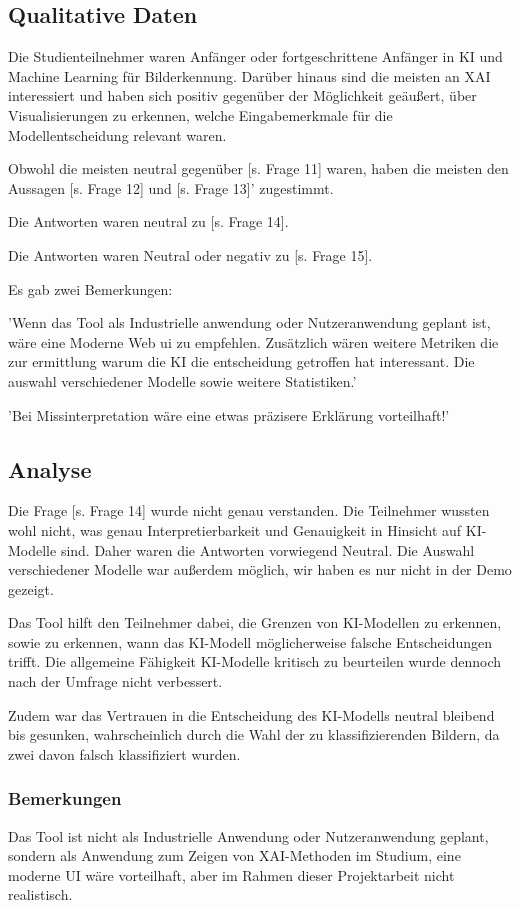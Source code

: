 \subsection{Qualitative Daten}
Die Studienteilnehmer waren Anfänger oder fortgeschrittene Anfänger in KI und Machine Learning für Bilderkennung. Darüber hinaus sind die meisten an XAI interessiert und haben sich positiv gegenüber der Möglichkeit geäußert, über Visualisierungen zu erkennen, welche Eingabemerkmale für die Modellentscheidung relevant waren.

Obwohl die meisten neutral gegenüber [s. Frage 11] waren, haben die meisten den Aussagen [s. Frage 12] und [s. Frage 13]' zugestimmt.

Die Antworten waren neutral zu [s. Frage 14].

Die Antworten waren Neutral oder negativ zu [s. Frage 15].

Es gab zwei Bemerkungen: 

'Wenn das Tool als Industrielle anwendung oder Nutzeranwendung geplant ist, wäre eine Moderne Web ui zu empfehlen. Zusätzlich wären weitere Metriken die zur ermittlung warum die KI die entscheidung getroffen hat interessant. Die auswahl verschiedener Modelle sowie weitere Statistiken.'

'Bei Missinterpretation wäre eine etwas präzisere Erklärung vorteilhaft!'

\subsection{Analyse}
Die Frage [s. Frage 14] wurde nicht genau verstanden. Die Teilnehmer wussten wohl nicht, was genau Interpretierbarkeit und Genauigkeit in Hinsicht auf KI-Modelle sind. Daher waren die Antworten vorwiegend Neutral. Die Auswahl verschiedener Modelle war außerdem möglich, wir haben es nur nicht in der Demo gezeigt.

Das Tool hilft den Teilnehmer dabei, die Grenzen von KI-Modellen zu erkennen, sowie zu erkennen, wann das KI-Modell möglicherweise falsche Entscheidungen trifft. Die allgemeine Fähigkeit KI-Modelle kritisch zu beurteilen wurde dennoch nach der Umfrage nicht verbessert.

Zudem war das Vertrauen in die Entscheidung des KI-Modells neutral bleibend bis gesunken, wahrscheinlich durch die Wahl der zu klassifizierenden Bildern, da zwei davon falsch klassifiziert wurden.
\subsubsection{Bemerkungen}
Das Tool ist nicht als Industrielle Anwendung oder Nutzeranwendung geplant, sondern als Anwendung zum Zeigen von XAI-Methoden im Studium, eine moderne UI wäre vorteilhaft, aber im Rahmen dieser Projektarbeit nicht realistisch.

